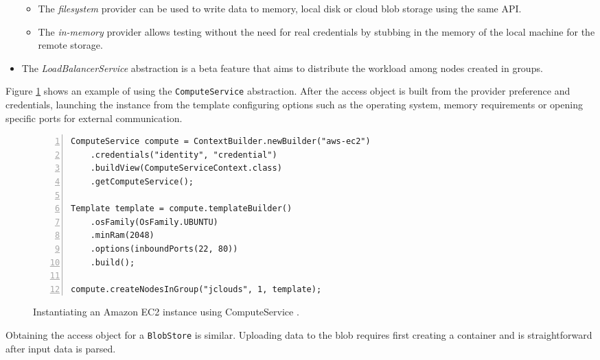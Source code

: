 \begin{itemize}
	\begin{itemize}
		\item The \textit{filesystem} provider can be used to write data to memory, local disk or cloud blob storage using the same API.
		\item The \textit{in-memory} provider allows testing without the need for real credentials by stubbing in the memory of the local machine for the remote storage.
	\end{itemize}
	\item The \textit{LoadBalancerService} abstraction is a beta feature that aims to distribute the workload among nodes created in groups.
\end{itemize}

Figure \ref{ComputeService} shows an example of using the \verb|ComputeService| abstraction. After the access object is built from the provider preference and credentials, launching the instance from the template configuring options such as the operating system, memory requirements or opening specific ports for external communication.

\begin{figure}[H]
	\centering
	\begin{minipage}{11.5cm}
		\begin{Verbatim}[fontsize=\small, numbers=left, frame=single]
ComputeService compute = ContextBuilder.newBuilder("aws-ec2")
    .credentials("identity", "credential")
    .buildView(ComputeServiceContext.class)
    .getComputeService();

Template template = compute.templateBuilder()
    .osFamily(OsFamily.UBUNTU)
    .minRam(2048)
    .options(inboundPorts(22, 80))
    .build();

compute.createNodesInGroup("jclouds", 1, template);
		\end{Verbatim}
	\end{minipage}
	\caption{Instantiating an Amazon EC2 instance using ComputeService \cite{jclouds}.}
	\label{ComputeService}
\end{figure}

Obtaining the access object for a \verb|BlobStore| is similar. Uploading data to the blob requires first creating a container and is straightforward after input data is parsed.

